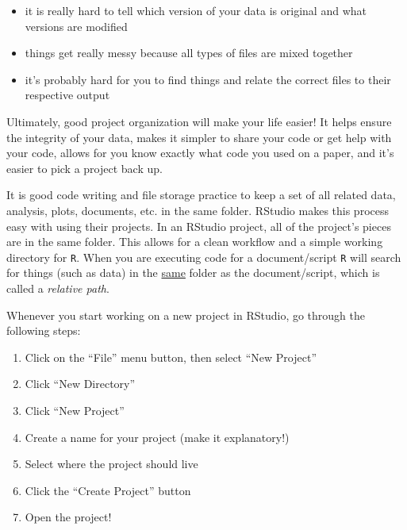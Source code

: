 \documentclass[
  10pt,
  letterpaper,
  twoside,
  openright]{book}
\providecommand{\tightlist}{%
  \setlength{\itemsep}{0pt}\setlength{\parskip}{0pt}}
\begin{document}
\begin{itemize}
\tightlist
\item
  it is really hard to tell which version of your data is original and
  what versions are modified\\
\item
  things get really messy because all types of files are mixed
  together\\
\item
  it's probably hard for you to find things and relate the correct files
  to their respective output
\end{itemize}

Ultimately, good project organization will make your life easier! It
helps ensure the integrity of your data, makes it simpler to share your
code or get help with your code, allows for you know exactly what code
you used on a paper, and it's easier to pick a project back up.

It is good code writing and file storage practice to keep a set of all
related data, analysis, plots, documents, etc. in the same folder.
RStudio makes this process easy with using their projects. In an RStudio
project, all of the project's pieces are in the same folder. This allows
for a clean workflow and a simple working directory for \texttt{R}. When
you are executing code for a document/script \texttt{R} will search for
things (such as data) in the \underline{same} folder as the
document/script, which is called a \emph{relative path}.

Whenever you start working on a new project in RStudio, go through the
following steps:

\begin{enumerate}
\def\labelenumi{\arabic{enumi}.}
\tightlist
\item
  Click on the ``File'' menu button, then select ``New Project''\\
\item
  Click ``New Directory''\\
\item
  Click ``New Project''\\
\item
  Create a name for your project (make it explanatory!)\\
\item
  Select where the project should live\\
\item
  Click the ``Create Project'' button\\
\item
  Open the project!
\end{enumerate}
\end{document}
